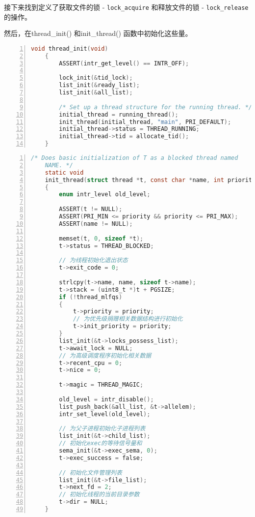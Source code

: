 \documentclass{article}
\begin{document}
	接下来找到定义了获取文件的锁 - \texttt{lock\_acquire} 和释放文件的锁 - \texttt{lock\_release}的操作。
	
	然后，在thread\_init() 和init\_thread() 函数中初始化这些量。
	
	\begin{lstlisting}[xleftmargin = 4em,xrightmargin = 4em, aboveskip = 1em, numbers = left, language = C,title=src/threads/thread.c - thread\_init()]
    void thread_init(void)
    {
    	ASSERT(intr_get_level() == INTR_OFF);
    	
    	lock_init(&tid_lock);
    	list_init(&ready_list);
    	list_init(&all_list);
    	
    	/* Set up a thread structure for the running thread. */
    	initial_thread = running_thread();
    	init_thread(initial_thread, "main", PRI_DEFAULT);
    	initial_thread->status = THREAD_RUNNING;
    	initial_thread->tid = allocate_tid();
    }
	\end{lstlisting}
	
	\begin{lstlisting}[xleftmargin = 4em,xrightmargin = 4em, aboveskip = 1em, numbers = left, language = C,title=src/threads/thread.c - init\_thread()]
    /* Does basic initialization of T as a blocked thread named
    NAME. */
    static void
    init_thread(struct thread *t, const char *name, int priority)
    {
    	enum intr_level old_level;
    	
    	ASSERT(t != NULL);
    	ASSERT(PRI_MIN <= priority && priority <= PRI_MAX);
    	ASSERT(name != NULL);
    	
    	memset(t, 0, sizeof *t);
    	t->status = THREAD_BLOCKED;
    	
    	// 为线程初始化退出状态
    	t->exit_code = 0;
    	
    	strlcpy(t->name, name, sizeof t->name);
    	t->stack = (uint8_t *)t + PGSIZE;
    	if (!thread_mlfqs)
    	{
    		t->priority = priority;
    		// 为优先级捐赠相关数据结构进行初始化
    		t->init_priority = priority;
    	}
    	list_init(&t->locks_possess_list);
    	t->await_lock = NULL;
    	// 为高级调度程序初始化相关数据
    	t->recent_cpu = 0;
    	t->nice = 0;
    	
    	t->magic = THREAD_MAGIC;
    	
    	old_level = intr_disable();
    	list_push_back(&all_list, &t->allelem);
    	intr_set_level(old_level);
    	
    	// 为父子进程初始化子进程列表
    	list_init(&t->child_list);
    	// 初始化exec的等待信号量和
    	sema_init(&t->exec_sema, 0);
    	t->exec_success = false;
    	
    	// 初始化文件管理列表
    	list_init(&t->file_list);
    	t->next_fd = 2;
    	// 初始化线程的当前目录参数
    	t->dir = NULL;
    }
	\end{lstlisting}
	
\end{document}
